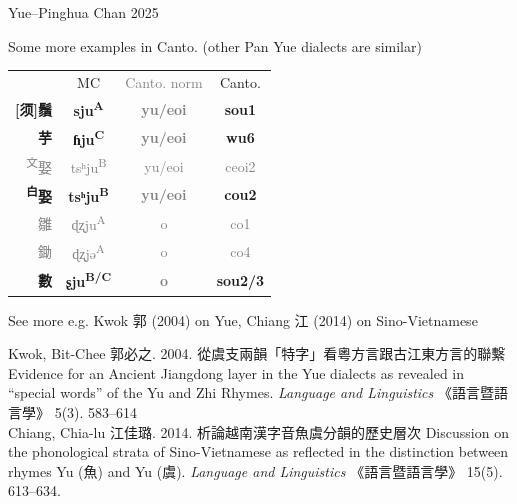\documentclass{beamer}
\begin{document}
\begin{frame}[fragile]{Yue–Pinghua \scriptsize{Chan 2025}}

{\small
Some more examples in Canto. (other Pan Yue dialects are similar)\\
\begin{table}
    \flushleft
    \begin{tabular}{r|c c c}
          & MC & \textcolor{gray}{Canto. norm} & Canto.\\
         \textbf{[须]鬚} & \textbf{sju\textsuperscript{A}} & \textbf{\textcolor{gray}{yu/eoi}} & \textbf{sou1}\\
         \textbf{芋} & \textbf{ɦju\textsuperscript{C}} & \textbf{\textcolor{gray}{yu/eoi}} & \textbf{wu6}\\
         \textcolor{gray}{\textsuperscript{文}娶} & \textcolor{gray}{tsʰju\textsuperscript{B}} & \textcolor{gray}{yu/eoi} & \textcolor{gray}{ceoi2}\\
         \textbf{\textsuperscript{白}娶} & \textbf{tsʰju\textsuperscript{B}} & \textbf{\textcolor{gray}{yu/eoi}} & \textbf{cou2}\\
         \textcolor{gray}{雛} & \textcolor{gray}{ɖʐju\textsuperscript{A}} & \textcolor{gray}{o} & \textcolor{gray}{co1}\\
         \textcolor{gray}{鋤} & \textcolor{gray}{ɖʐjə\textsuperscript{A}} & \textcolor{gray}{o} & \textcolor{gray}{co4}\\
         \textbf{數} & \textbf{ʂju\textsuperscript{B/C}} & \textbf{\textcolor{gray}{o}} & \textbf{sou2/3}\\
    \end{tabular}
\end{table}
See more e.g. Kwok 郭 (2004) on Yue, Chiang 江 (2014) on Sino-Vietnamese\\
}
\vfill {} {\tiny Kwok, Bit-Chee 郭必之. 2004. 從虞支兩韻「特字」看粵方言跟古江東方言的聯繫 Evidence for an Ancient Jiangdong layer in the Yue dialects as revealed in “special words” of the Yu and Zhi Rhymes. \textit{Language and Linguistics} 《語言暨語言學》 5(3). 583–614\\
Chiang, Chia-lu 江佳璐. 2014. 析論越南漢字音魚虞分韻的歷史層次 Discussion on the phonological strata of Sino-Vietnamese as reflected in the distinction between rhymes Yu (魚) and Yu (虞). \textit{Language and Linguistics} 《語言暨語言學》 15(5). 613–634.
\par} 

\end{frame}
\end{document}

